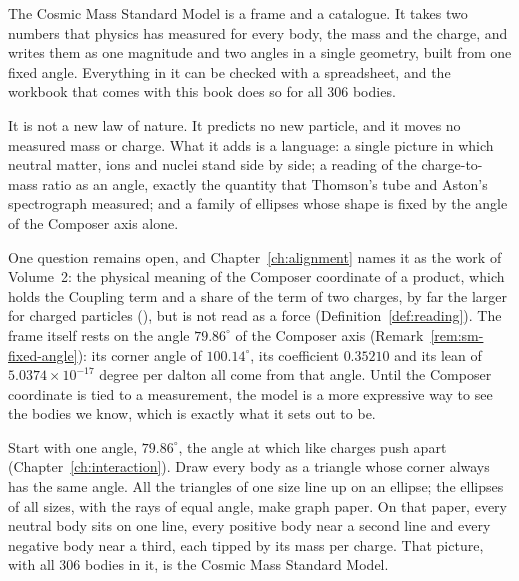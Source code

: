 The Cosmic Mass Standard Model is a frame and a catalogue. It takes two numbers that physics has measured for every body, the mass and the charge, and writes them as one magnitude and two angles in a single geometry, built from one fixed angle. Everything in it can be checked with a spreadsheet, and the workbook that comes with this book does so for all 306 bodies.

It is not a new law of nature. It predicts no new particle, and it moves no measured mass or charge. What it adds is a language: a single picture in which neutral matter, ions and nuclei stand side by side; a reading of the charge-to-mass ratio as an angle, exactly the quantity that Thomson's tube and Aston's spectrograph measured; and a family of ellipses whose shape is fixed by the angle of the Composer axis alone.

One question remains open, and Chapter~\ref{ch:alignment} names it as the work of Volume~2: the physical meaning of the Composer coordinate of a product, which holds the Coupling term and a share of the term of two charges, by far the larger for charged particles (), but is not read as a force (Definition~\ref{def:reading}). The frame itself rests on the angle $79.86^\circ$ of the Composer axis (Remark~\ref{rem:sm-fixed-angle}): its corner angle of $100.14^\circ$, its coefficient $0.35210$ and its lean of $5.0374 \times 10^{-17}$ degree per dalton all come from that angle. Until the Composer coordinate is tied to a measurement, the model is a more expressive way to see the bodies we know, which is exactly what it sets out to be.

\begin{plainwords}
Start with one angle, $79.86^\circ$, the angle at which like charges push apart (Chapter~\ref{ch:interaction}). Draw every body as a triangle whose corner always has the same angle. All the triangles of one size line up on an ellipse; the ellipses of all sizes, with the rays of equal angle, make graph paper. On that paper, every neutral body sits on one line, every positive body near a second line and every negative body near a third, each tipped by its mass per charge. That picture, with all 306 bodies in it, is the Cosmic Mass Standard Model.
\end{plainwords}

